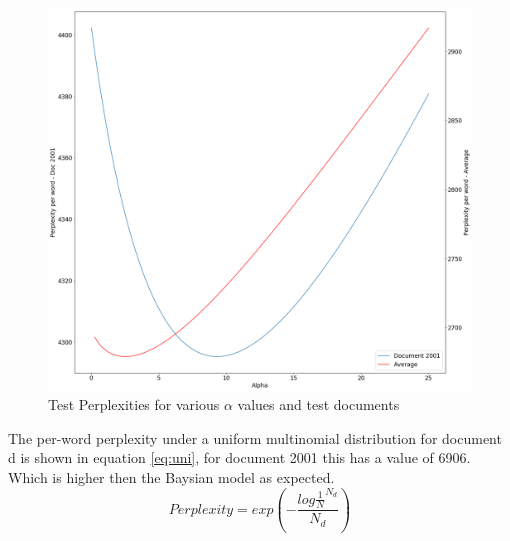\documentclass[twoside,twocolumn]{article}
\begin{document}
\begin{figure}[h]
  \centering
    \includegraphics[width=\linewidth]{c_1}
  \caption{Test Perplexities for various $\alpha$ values and test documents}
  \label{fig:c_1}
\end{figure}
The per-word perplexity under a uniform multinomial distribution for document d is shown in equation \ref{eq:uni}, for document 2001 this has a value of 6906. Which is higher then the Baysian model as expected.
\begin{equation}
Perplexity = exp ( - \frac{log \frac{1}{N}^{N_d}}{N_d}  )
\label{eq:uni}
\end{equation}
\end{document}
